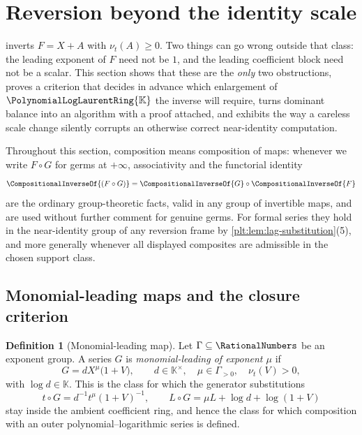 \documentclass[11pt,oneside]{article}
\theoremstyle{plain}
\theoremstyle{definition}
\newtheorem{definition}[theorem]{Definition}
\theoremstyle{remark}
\newcommand{\K}{\mathbb{K}}
\newcommand{\PLlau}{\PolynomialLogLaurentRing{\K}}       %
\newcommand{\ordt}{\nu_{t}}                              %
\newcommand{\compose}{\mathbin{\circ}}
\newcommand{\rev}[1]{\CompositionalInverseOf{#1}}
\begin{document}
\section{Reversion beyond the identity scale}
\label{plt:sec:dominant-balance}

 inverts \(F=X+A\) with \(\ordt(A)\ge0\).  Two
things can go wrong outside that class: the leading exponent of \(F\) need not
be \(1\), and the leading coefficient block need not be a scalar.  This section
shows that these are the \emph{only} two obstructions, proves a criterion that
decides in advance which enlargement of \(\PLlau\) the inverse will require,
turns dominant balance into an algorithm with a proof attached, and exhibits
the way a careless scale change silently corrupts an otherwise correct
near-identity computation.

Throughout this section, composition means composition of maps: whenever we
write \(F\compose G\) for germs at \(+\infty\), associativity and the
functorial identity
\begin{equation}
\label{plt:eq:lag-functorial}
  \rev{(F\compose G)}=\rev{G}\compose\rev{F}
\end{equation}
are the ordinary group-theoretic facts, valid in any group of invertible
maps, and are used without further comment for genuine germs.  For formal
series they hold in the near-identity group of any reversion frame by
\cref{plt:lem:lag-substitution}(5), and more generally whenever all displayed
composites are admissible in the chosen support class.

\subsection{Monomial-leading maps and the closure criterion}
\label{plt:sec:lag-criterion}

\begin{definition}[Monomial-leading map]
\label{plt:def:lag-monomial-leading}
Let \(\Gamma\subseteq\RationalNumbers\) be an exponent group.  A series
\(G\) is \emph{monomial-leading of exponent \(\mu\)} if
\begin{equation}
\label{plt:eq:lag-monomial-leading}
  G=dX^{\mu}\bigl(1+V\bigr),
  \qquad d\in\K^\times,\quad \mu\in\Gamma_{>0},\quad \ordt(V)>0,
\end{equation}
with \(\log d\in\K\).  This is the class for which the generator substitutions
\begin{equation}
\label{plt:eq:lag-generator-substitution}
  t\compose G=d^{-1}t^{\mu}(1+V)^{-1},
  \qquad
  L\compose G=\mu L+\log d+\log(1+V)
\end{equation}
stay inside the ambient coefficient ring, and hence the class for which
composition with an outer polynomial--logarithmic series is defined.
\end{definition}
\end{document}
